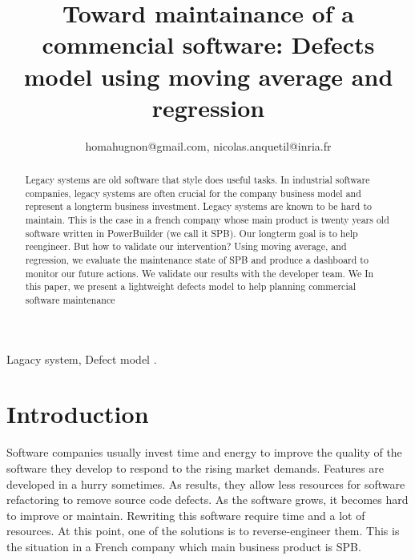 \documentclass[10pt,conference]{IEEEtran}
\begin{document}
\title{Toward  maintainance of  a commencial software: Defects model  using moving average and regression}

\author{
homahugnon@gmail.com, nicolas.anquetil@inria.fr}


\maketitle

\begin{abstract}
Legacy systems are old software that style does useful tasks. In industrial software companies, legacy systems are often crucial for the company business model and represent a longterm business investment. Legacy systems are known to be hard to maintain. This is the case in a french company whose main product is twenty years old software written in PowerBuilder (we call it SPB).  Our longterm goal is to help reengineer. But how to validate our intervention? Using moving average, and regression, we evaluate the maintenance state of SPB and produce a dashboard to monitor our future actions. We validate our results with the developer team. We  In this paper, we present a lightweight defects model to help planning commercial software maintenance
\end{abstract}

\begin{IEEEkeywords}
Lagacy system, Defect model .
\end{IEEEkeywords}

\section{Introduction}
Software companies usually invest time and energy to improve the quality of the software they develop to respond to the rising market demands. Features are developed in a hurry sometimes.  As results, they  allow less resources for software refactoring to remove source code defects.   As the software grows,  it becomes hard to improve or maintain. Rewriting this software require time and a lot of resources. At this point, one of the solutions is to reverse-engineer them.  This is the situation in a French company which main business product is SPB.
\end{document}
